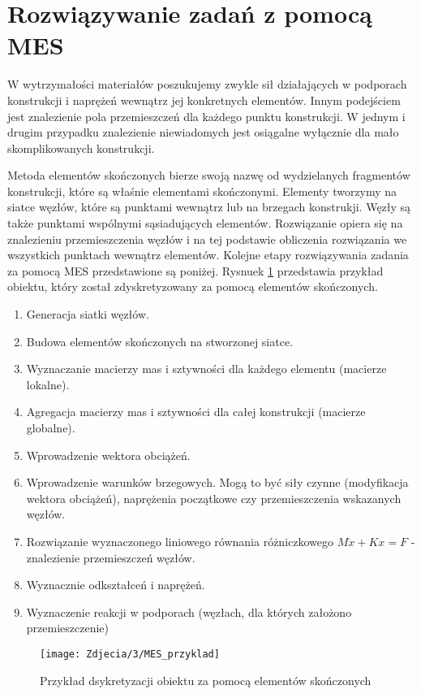 
\section{Rozwiązywanie zadań z  pomocą MES}
\label{sec:rozwiazwyanie_zadan}

W wytrzymałości materiałów poszukujemy zwykle sił działających w podporach konstrukcji i naprężeń wewnątrz jej konkretnych elementów. Innym podejściem jest znalezienie pola przemieszczeń dla każdego punktu konstrukcji.  W jednym i drugim przypadku znalezienie niewiadomych jest osiągalne wyłącznie dla mało skomplikowanych konstrukcji.

Metoda elementów skończonych bierze swoją nazwę od wydzielanych fragmentów konstrukcji, które są właśnie elementami skończonymi. Elementy tworzymy na siatce węzłów, które są punktami wewnątrz lub na brzegach konstrukji. Węzły są także punktami wspólnymi sąsiadujących elementów. Rozwiązanie opiera się na znalezieniu przemieszczenia węzłów i na tej podstawie obliczenia rozwiązania we wszystkich punktach wewnątrz elementów. Kolejne etapy rozwiązywania zadania za pomocą MES przedstawione są poniżej. Rysnuek \ref{fig:MES_przyklad} przedstawia przykład obiektu, który został zdyskretyzowany za pomocą elementów skończonych.

\vspace{5 mm}

\begin{enumerate}
  \item Generacja siatki węzłów.
  \item Budowa elementów skończonych na stworzonej siatce.
  \item Wyznaczanie macierzy mas i sztywności dla każdego elementu (macierze lokalne).
  \item Agregacja macierzy mas  i sztywności dla całej konstrukcji (macierze globalne).
  \item Wprowadzenie wektora obciążeń.
  \item Wprowadzenie warunków brzegowych. Mogą to być siły czynne (modyfikacja wektora obciążeń), naprężenia początkowe czy przemieszczenia wskazanych węzłów.
  \item Rozwiązanie wyznaczonego liniowego równania różniczkowego \( M \ddot x + Kx = F \) - znalezienie przemieszczeń węzłów.
  \item Wyznacznie odkształceń i naprężeń.
  \item Wyznaczenie reakcji w podporach (węzłach, dla których założono przemieszczenie)
\end{enumerate}

\vspace{5 mm}

\begin{figure}[h]
\centering
\texttt{[image: Zdjecia/3/MES\_przyklad]}
\caption{Przykład dsykretyzacji obiektu za pomocą elementów skończonych}
\label{fig:MES_przyklad}
\end{figure}





















